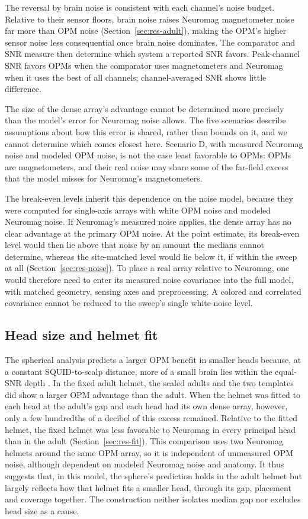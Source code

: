 \documentclass[preprint,12pt,authoryear,a4paper]{elsarticle}
\begin{document}
The reversal by brain noise is consistent with each channel's noise budget. Relative to their sensor floors, brain noise raises Neuromag magnetometer noise far more than OPM noise (Section~\ref{sec:res-adult}), making the OPM's higher sensor noise less consequential once brain noise dominates. The comparator and SNR measure then determine which system a reported SNR favors. Peak-channel SNR favors OPMs when the comparator uses magnetometers and Neuromag when it uses the best of all channels; channel-averaged SNR shows little difference.

The size of the dense array's advantage cannot be determined more precisely than the model's error for Neuromag noise allows. The five scenarios describe assumptions about how this error is shared, rather than bounds on it, and we cannot determine which comes closest here. Scenario D, with measured Neuromag noise and modeled OPM noise, is not the case least favorable to OPMs: OPMs are magnetometers, and their real noise may share some of the far-field excess that the model misses for Neuromag's magnetometers.

The break-even levels inherit this dependence on the noise model, because they were computed for single-axis arrays with white OPM noise and modeled Neuromag noise. If Neuromag's measured noise applies, the dense array has no clear advantage at the primary OPM noise. At the point estimate, its break-even level would then lie above that noise by an amount the medians cannot determine, whereas the site-matched level would lie below it, if within the sweep at all (Section~\ref{sec:res-noise}). To place a real array relative to Neuromag, one would therefore need to enter its measured noise covariance into the full model, with matched geometry, sensing axes and preprocessing. A colored and correlated covariance cannot be reduced to the sweep's single white-noise level.

\subsection{Head size and helmet fit}\label{sec:disc-fit}

The spherical analysis predicts a larger OPM benefit in smaller heads because, at a constant SQUID-to-scalp distance, more of a small brain lies within the equal-SNR depth \citep{jas2026}. In the fixed adult helmet, the scaled adults and the two templates did show a larger OPM advantage than the adult. When the helmet was fitted to each head at the adult's gap and each head had its own dense array, however, only a few hundredths of a decibel of this excess remained. Relative to the fitted helmet, the fixed helmet was less favorable to Neuromag in every principal head than in the adult (Section~\ref{sec:res-fit}). This comparison uses two Neuromag helmets around the same OPM array, so it is independent of unmeasured OPM noise, although dependent on modeled Neuromag noise and anatomy. It thus suggests that, in this model, the sphere's prediction holds in the adult helmet but largely reflects how that helmet fits a smaller head, through its gap, placement and coverage together. The construction neither isolates median gap nor excludes head size as a cause.
\end{document}
